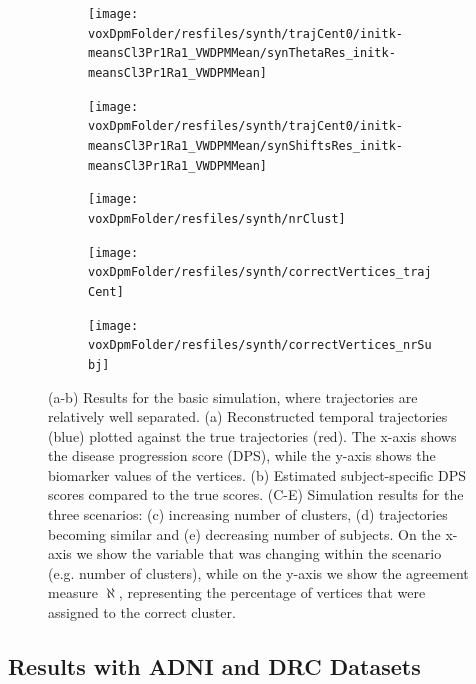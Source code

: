 \begin{figure}
\centering
\begin{subfigure}[b]{0.7\textwidth}
\texttt{[image: \\voxDpmFolder/resfiles/synth/trajCent0/initk-meansCl3Pr1Ra1\_VWDPMMean/synThetaRes\_initk-meansCl3Pr1Ra1\_VWDPMMean]}
\caption{}
\label{diveResSynthA}
\end{subfigure}
\begin{subfigure}[b]{0.25\textwidth}
\texttt{[image: \\voxDpmFolder/resfiles/synth/trajCent0/initk-meansCl3Pr1Ra1\_VWDPMMean/synShiftsRes\_initk-meansCl3Pr1Ra1\_VWDPMMean]}
\vspace{0.4em}
\caption{}
\label{diveResSynthB}
\end{subfigure}
\begin{subfigure}[b]{0.32\textwidth}
\texttt{[image: \\voxDpmFolder/resfiles/synth/nrClust]}
\caption{}
\label{diveResSynthC}
\end{subfigure}
\begin{subfigure}[b]{0.32\textwidth}
\texttt{[image: \\voxDpmFolder/resfiles/synth/correctVertices\_trajCent]}
\caption{}
\label{diveResSynthD}
\end{subfigure}
\begin{subfigure}[b]{0.32\textwidth}
\texttt{[image: \\voxDpmFolder/resfiles/synth/correctVertices\_nrSubj]}
\caption{}
\label{diveResSynthE}
\end{subfigure}
\caption[DIVE Simulation Results]{(a-b) Results for the basic simulation, where trajectories are relatively well separated. (a) Reconstructed temporal trajectories (blue) plotted against the true trajectories (red). The x-axis shows the disease progression score (DPS), while the y-axis shows the biomarker values of the vertices. (b) Estimated subject-specific DPS scores compared to the true scores. (C-E) Simulation results for the three scenarios: (c) increasing number of clusters, (d) trajectories becoming similar and (e) decreasing number of subjects. On the x-axis we show the variable that was changing within the scenario (e.g. number of clusters), while on the y-axis we show the agreement measure $\aleph$, representing the percentage of vertices that were assigned to the correct cluster.}
\label{diveResSynth}
\end{figure}


\subsection{Results with ADNI and DRC Datasets}
\label{sec:diveResAdniDrc}

